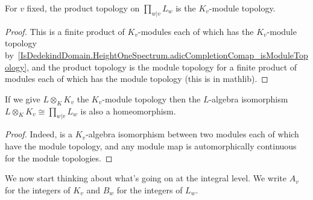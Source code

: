\begin{theorem}
  \label{IsDedekindDomain.HeightOneSpectrum.prodAdicCompletionComap_isModuleTopology}
  \leanok
  For $v$ fixed, the product topology on $\prod_{w|v}L_w$ is the $K_v$-module
  topology.
\end{theorem}
\begin{proof}
  \leanok
  This is a finite product of $K_v$-modules each of which has the $K_v$-module topology
  by~\ref{IsDedekindDomain.HeightOneSpectrum.adicCompletionComap_isModuleTopology},
  and the product topology is the module topology for a finite product of modules each of which
  has the module topology (this is in mathlib).
\end{proof}

\begin{theorem}
  \label{IsDedekindDomain.HeightOneSpectrum.adicCompletionComapContinuousAlgEquiv}
  If we give $L\otimes_KK_v$ the $K_v$-module topology then the $L$-algebra isomorphism
  $L\otimes_K K_v\cong\prod_{w|v}L_w$ is also a homeomorphism.
\end{theorem}
\begin{proof} Indeed, is a $K_v$-algebra isomorphism between two modules each of which
  have the module topology, and any module map is automorphically continuous for the
  module topologies.
\end{proof}

We now start thinking about what's going on at the integral level. We write $A_v$
for the integers of $K_v$ and $B_w$ for the integers of $L_w$.


